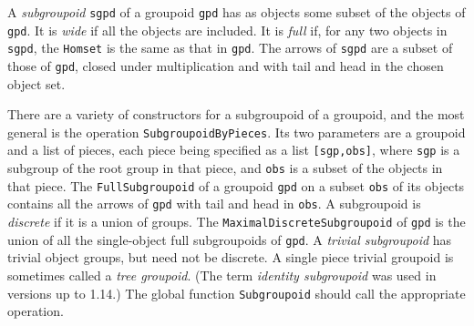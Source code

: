 \documentclass[a4paper,11pt]{report}
\begin{document}
{{{ A \emph{subgroupoid} \texttt{sgpd} of a groupoid \texttt{gpd} has as objects some subset of the objects of \texttt{gpd}. It is \emph{wide} if all the objects are included. It is \emph{full} if, for any two objects in \texttt{sgpd}, the \texttt{Homset} is the same as that in \texttt{gpd}. The arrows of \texttt{sgpd} are a subset of those of \texttt{gpd}, closed under multiplication and with tail and head in the chosen object set. 

 There are a variety of constructors for a subgroupoid of a groupoid, and the
most general is the operation \texttt{SubgroupoidByPieces}. Its two parameters are a groupoid and a list of pieces, each piece being
specified as a list \texttt{[sgp,obs]}, where \texttt{sgp} is a subgroup of the root group in that piece, and \texttt{obs} is a subset of the objects in that piece. The \texttt{FullSubgroupoid} of a groupoid \texttt{gpd} on a subset \texttt{obs} of its objects contains all the arrows of \texttt{gpd} with tail and head in \texttt{obs}. A subgroupoid is \emph{discrete} if it is a union of groups. The \texttt{MaximalDiscreteSubgroupoid} of \texttt{gpd} is the union of all the single-object full subgroupoids of \texttt{gpd}. A  \emph{trivial subgroupoid} has trivial object groups, but need not be discrete. A single piece trivial
groupoid is sometimes called a  \emph{tree groupoid}. (The term  \emph{identity subgroupoid} was used in versions up to 1.14.) The global function \texttt{Subgroupoid} should call the appropriate operation. 

 }

 
\begin{Verbatim}[commandchars=!@|,fontsize=\small,frame=single,label=Example]
  

\end{Verbatim}}}
\end{document}
